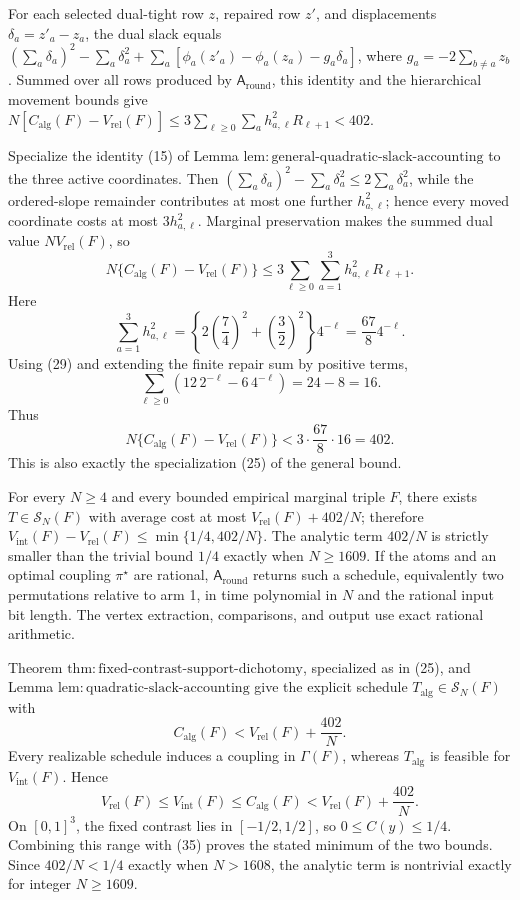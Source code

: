 For each selected dual-tight row \(z\), repaired row \(z'\), and displacements \(\delta_a=z'_a-z_a\), the dual slack equals \((\sum_a\delta_a)^2-\sum_a\delta_a^2+\sum_a[\phi_a(z'_a)-\phi_a(z_a)-g_a\delta_a]\), where \(g_a=-2\sum_{b\ne a}z_b\).  Summed over all rows produced by \(\mathsf A_{\mathrm{round}}\), this identity and the hierarchical movement bounds give \(N[C_{\mathrm{alg}}(F)-V_{\mathrm{rel}}(F)]\le3\sum_{\ell\ge0}\sum_a h_{a,\ell}^2R_{\ell+1}<402\).

Specialize the identity (15) of Lemma \(\mathrm{lem{:}general\mbox{-}quadratic\mbox{-}slack\mbox{-}accounting}\) to the three active coordinates.  Then \((\sum_a\delta_a)^2-\sum_a\delta_a^2\le2\sum_a\delta_a^2\), while the ordered-slope remainder contributes at most one further \(h_{a,\ell}^2\); hence every moved coordinate costs at most \(3h_{a,\ell}^2\).  Marginal preservation makes the summed dual value \(NV_{\mathrm{rel}}(F)\), so
\[
 N\{C_{\mathrm{alg}}(F)-V_{\mathrm{rel}}(F)\}
 \le3\sum_{\ell\ge0}\sum_{a=1}^3h_{a,\ell}^2R_{\ell+1}. \tag{30}
\]
Here
\[
 \sum_{a=1}^3h_{a,\ell}^2
 =\left\{2\left(\frac74\right)^2+\left(\frac32\right)^2\right\}4^{-\ell}
 =\frac{67}{8}4^{-\ell}. \tag{31}
\]
Using (29) and extending the finite repair sum by positive terms,
\[
 \sum_{\ell\ge0}(12\,2^{-\ell}-6\,4^{-\ell})=24-8=16. \tag{32}
\]
Thus
\[
 N\{C_{\mathrm{alg}}(F)-V_{\mathrm{rel}}(F)\}
 <3\cdot\frac{67}{8}\cdot16=402. \tag{33}
\]
This is also exactly the specialization (25) of the general bound.

For every \(N\ge4\) and every bounded empirical marginal triple \(F\), there exists \(T\in\mathcal S_N(F)\) with average cost at most \(V_{\mathrm{rel}}(F)+402/N\); therefore \(V_{\mathrm{int}}(F)-V_{\mathrm{rel}}(F)\le\min\{1/4,402/N\}\).  The analytic term \(402/N\) is strictly smaller than the trivial bound \(1/4\) exactly when \(N\ge1609\).  If the atoms and an optimal coupling \(\pi^\star\) are rational, \(\mathsf A_{\mathrm{round}}\) returns such a schedule, equivalently two permutations relative to arm 1, in time polynomial in \(N\) and the rational input bit length.  The vertex extraction, comparisons, and output use exact rational arithmetic.

Theorem \(\mathrm{thm{:}fixed\mbox{-}contrast\mbox{-}support\mbox{-}dichotomy}\), specialized as in (25), and Lemma \(\mathrm{lem{:}quadratic\mbox{-}slack\mbox{-}accounting}\) give the explicit schedule \(T_{\mathrm{alg}}\in\mathcal S_N(F)\) with
\[
 C_{\mathrm{alg}}(F)<V_{\mathrm{rel}}(F)+\frac{402}{N}. \tag{34}
\]
Every realizable schedule induces a coupling in \(\Gamma(F)\), whereas \(T_{\mathrm{alg}}\) is feasible for \(V_{\mathrm{int}}(F)\).  Hence
\[
 V_{\mathrm{rel}}(F)\le V_{\mathrm{int}}(F)\le C_{\mathrm{alg}}(F)
 <V_{\mathrm{rel}}(F)+\frac{402}{N}. \tag{35}
\]
On \([0,1]^3\), the fixed contrast lies in \([-1/2,1/2]\), so \(0\le C(y)\le1/4\).  Combining this range with (35) proves the stated minimum of the two bounds.  Since \(402/N<1/4\) exactly when \(N>1608\), the analytic term is nontrivial exactly for integer \(N\ge1609\).

